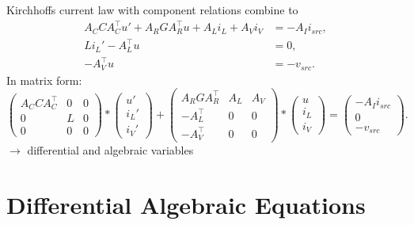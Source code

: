 	\begin{frame}
		\vfill
		Kirchhoffs current law with component relations combine to 
		\begin{displaymath}
			\begin{aligned}
				A_C C A_C^\top u' + A_R G A_R^\top u + A_L i_L + A_V i_V &= - A_I i_{src} , \\
				L i_L'	- A_L^\top u &= 0 , \\
				-A_V^\top u &=  -v_{src}.
			\end{aligned}	
		\end{displaymath}
		In matrix form:
		\begin{equation}
			\label{MNA_Matrixform}
			\begin{pmatrix}
				A_C C A_C^\top & 0 & 0 \\
				0 & L & 0 \\
				0 & 0 & 0
			\end{pmatrix}
			*
			\begin{pmatrix}
				u' \\
				i_L' \\
				i_V'
			\end{pmatrix}
			+
			\begin{pmatrix}
				A_R G A_R^\top & A_L & A_V \\
				-A_L^\top & 0 & 0 \\
				-A_V^\top & 0 & 0 
			\end{pmatrix}
			*
			\begin{pmatrix}
				u \\
				i_L \\
				i_V
			\end{pmatrix}
			=
			\begin{pmatrix}
				-A_I i_{src} \\
				0 \\
				-v_{src}
			\end{pmatrix} . 
		\end{equation}
		$\to$ differential and algebraic variables
		\vfill
	\end{frame}

\section*{Differential Algebraic Equations}
